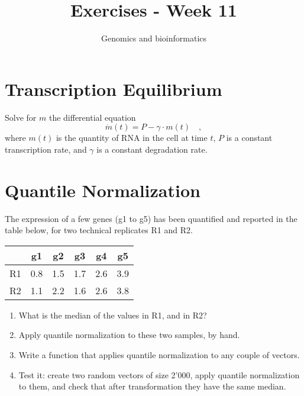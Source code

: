 \documentclass[a4paper,11pt]{article}
\title{Exercises - Week 11}
\date{}
\author{Genomics and bioinformatics}
\begin{document}
\maketitle

\section{Transcription Equilibrium}

\noindent
Solve for $m$ the differential equation
$$ \dot{m}(t) = P - \gamma\cdot m(t) \quad , $$
where $m(t)$ is the quantity of RNA in the cell at time $t$, $P$ is a constant transcription rate, 
and $\gamma$ is a constant degradation rate.

\section{Quantile Normalization}

\noindent
The expression of a few genes (g1 to g5) has been quantified and reported in the table below,
for two technical replicates R1 and R2. 

\begin{table}[tbh]
\centering
\begin{tabular}{ c | ccccc }
      &     g1   &    g2    &    g3    &    g4    &   g5 \\
      \hline
R1 &    0.8   &    1.5   &   1.7    &    2.6   &   3.9    \\
R2 &    1.1   &    2.2   &   1.6    &    2.6   &   3.8   
\end{tabular}
\end{table}

\begin{enumerate}
\item What is the median of the values in R1, and in R2?
\item Apply quantile normalization to these two samples, by hand.
\item Write a function that applies quantile normalization to any couple of vectors.
\item Test it: create two random vectors of size 2'000, apply quantile normalization to them, and
	check that after transformation they have the same median.
\end{enumerate}
\end{document}
